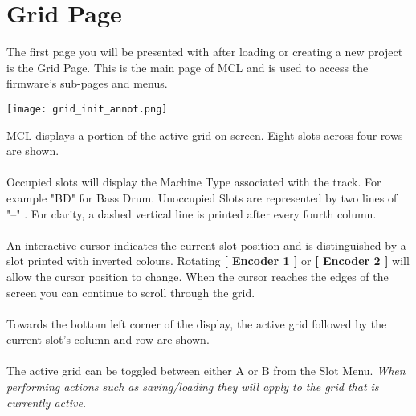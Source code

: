 
\chapter{Grid Page}
The first page you will be presented with after loading or creating a new project is the Grid Page. This is the main page of MCL and is used to access the firmware's sub-pages and menus.

\begin{center}
	\texttt{[image: grid\_init\_annot.png]}
\end{center}
MCL displays a portion of the active grid on screen. 
Eight slots across four rows are shown.\\
\\
Occupied slots will display the Machine Type associated with the track. For example "BD" for Bass Drum. Unoccupied Slots are represented by two lines of "--" . For clarity, a dashed vertical line is printed after every fourth column.\\\\
An interactive cursor indicates the current slot position and is distinguished by a slot printed with inverted colours. Rotating \textbf{[ Encoder 1 ]} or \textbf{[ Encoder 2 ]} will allow the cursor position to change. When the cursor reaches the edges of the screen you can continue to scroll through the grid.
\\\\
Towards the bottom left corner of the display, the active grid followed by the current slot's column and row are shown.\\\\
The active grid can be toggled between either A or B from the Slot Menu.
\textit{When performing actions such as saving/loading they will apply to the grid that is currently active.}
\\
